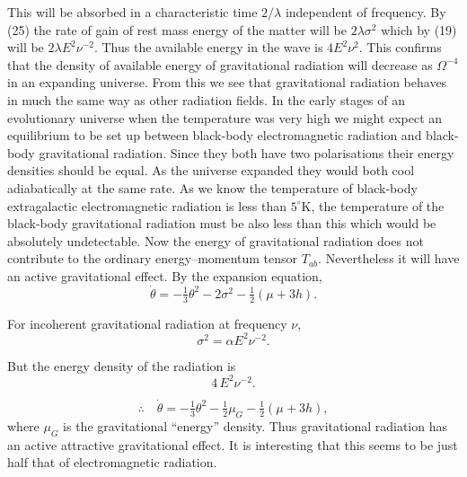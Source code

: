 This will be absorbed in a characteristic time $2/\lambda$ independent of 
frequency. By (25) the rate of gain of rest mass energy of the 
matter will be $2\lambda\sigma^{2}$ which by (19) will be $2\lambda E^{2}\nu^{-2}$. 
Thus the available energy in the wave is $4 E^{2}\nu^{2}$. This confirms that the 
density of available energy of gravitational radiation will decrease 
as $\Omega^{-4}$ in an expanding universe. From this we see that 
gravitational radiation behaves in much the same way as other 
radiation fields. In the early stages of an evolutionary universe 
when the temperature was very high we might expect an equilibrium to 
be set up between black-body electromagnetic radiation and black-body 
gravitational radiation. Since they both have two polarisations their energy densities should be equal. As the universe expanded they would 
both cool adiabatically at the same rate. As we know the temperature 
of black-body extragalactic electromagnetic radiation is less than 
$5^\circ$K, the temperature of the black-body gravitational radiation must 
be also less than this which would be absolutely undetectable. Now 
the energy of gravitational radiation does not contribute to the 
ordinary energy–momentum tensor $T_{ab}$. Nevertheless it will have an 
active gravitational effect. By the expansion equation,
\[
\dot{\theta} = -\tfrac{1}{3}\theta^{2} - 2\sigma^{2} - \tfrac{1}{2}(\mu + 3h).
\]

For incoherent gravitational radiation at frequency $\nu$,
\[
\sigma^{2} = \alpha E^{2}\nu^{-2}.
\]

But the energy density of the radiation is
\[
4\,E^{2}\nu^{-2}.
\]

\[
\therefore \quad \dot{\theta} = -\tfrac{1}{3}\theta^{2} - \tfrac{1}{2}\mu_{G} - \tfrac{1}{2}(\mu + 3h),
\]
where $\mu_{G}$ is the gravitational ``energy'' density. Thus gravitational 
radiation has an active attractive gravitational effect. It is 
interesting that this seems to be just half that of electromagnetic 
radiation.


